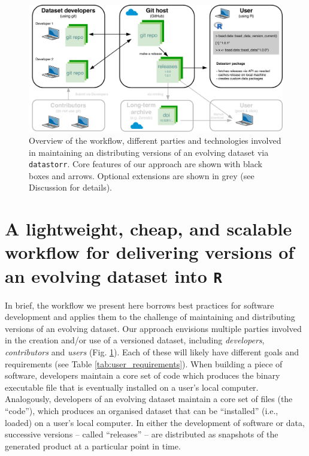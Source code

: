 \documentclass[a4paper,num-refs]{assets/oup-contemporary}
\begin{document}
\begin{figure}[!hb]
\centering
\includegraphics[width=\linewidth]{figures/Figure-stack.pdf}
\caption{Overview of the workflow, different parties and technologies involved in maintaining an distributing versions of an evolving dataset via \texttt{datastorr}.  Core features of our approach are shown with black boxes and arrows. Optional extensions are shown in grey (see Discussion for details).}
\label{fig:technology_stack}
\end{figure}

\section{A lightweight, cheap, and scalable workflow for delivering versions of an evolving dataset into \texttt{R}}

In brief, the workflow we present here borrows best practices for software development \cite{Perez-Riverol-2016} and applies them to the challenge of maintaining and distributing versions of an evolving dataset. Our approach envisions multiple parties involved in the creation and/or use of a versioned dataset, including \emph{developers}, \emph{contributors} and \emph{users} (Fig. \ref{fig:technology_stack}). Each of these will likely have different goals and requirements (see Table \ref{tab:user_requirements}). When building a piece of software, developers maintain a core set of code which produces the binary executable file that is eventually installed on a user's local computer. Analogously, developers of an evolving dataset maintain a core set of files (the ``code''), which produces an organised dataset that can be ``installed'' (i.e., loaded) on a user's local computer. In either the development of software or data, successive versions -- called ``releases'' -- are distributed as snapshots of the generated product at a particular point in time. 
\end{document}
